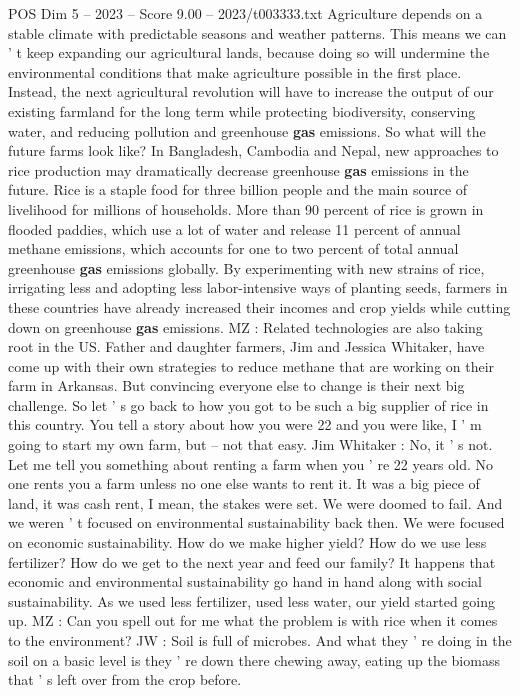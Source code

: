 \begin{textsample}{POS Dim 5 – 2023 – Score 9.00 – 2023/t003333.txt}
Agriculture depends on a stable climate with predictable seasons and weather patterns.
This means we can ' t keep expanding our agricultural lands, because doing so will undermine the environmental conditions that make agriculture possible in the first place.
Instead, the next agricultural revolution will have to increase the output of our existing farmland for the long term while protecting biodiversity, conserving water, and reducing pollution and greenhouse \textbf{gas} emissions.
So what will the future farms look like?
In Bangladesh, Cambodia and Nepal, new approaches to rice production may dramatically decrease greenhouse \textbf{gas} emissions in the future.
Rice is a staple food for three billion people and the main source of livelihood for millions of households.
More than 90 percent of rice is grown in flooded paddies, which use a lot of water and release 11 percent of annual methane emissions, which accounts for one to two percent of total annual greenhouse \textbf{gas} emissions globally.
By experimenting with new strains of rice, irrigating less and adopting less labor-intensive ways of planting seeds, farmers in these countries have already increased their incomes and crop yields while cutting down on greenhouse \textbf{gas} emissions.
MZ : Related technologies are also taking root in the US.
Father and daughter farmers, Jim and Jessica Whitaker, have come up with their own strategies to reduce methane that are working on their farm in Arkansas.
But convincing everyone else to change is their next big challenge.
So let ' s go back to how you got to be such a big supplier of rice in this country.
You tell a story about how you were 22 and you were like, I ' m going to start my own farm, but -- not that easy.
Jim Whitaker : No, it ' s not.
Let me tell you something about renting a farm when you ' re 22 years old.
No one rents you a farm unless no one else wants to rent it.
It was a big piece of land, it was cash rent, I mean, the stakes were set.
We were doomed to fail.
And we weren ' t focused on environmental sustainability back then.
We were focused on economic sustainability.
How do we make higher yield?
How do we use less fertilizer?
How do we get to the next year and feed our family?
It happens that economic and environmental sustainability go hand in hand along with social sustainability.
As we used less fertilizer, used less water, our yield started going up.
MZ : Can you spell out for me what the problem is with rice when it comes to the environment?
JW : Soil is full of microbes.
And what they ' re doing in the soil on a basic level is they ' re down there chewing away, eating up the biomass that ' s left over from the crop before.

\end{textsample}
